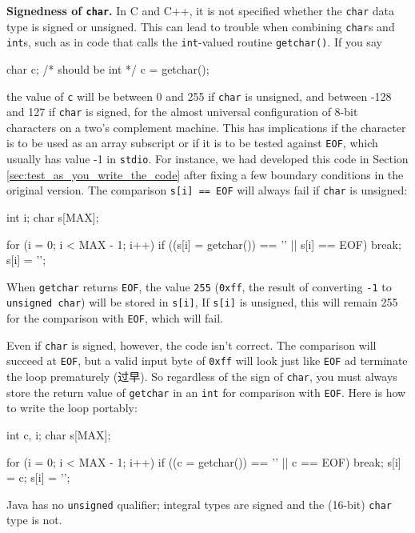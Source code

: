 \textbf{Signedness of \texttt{char}.} In C and C++, it is not specified
whether the \verb'char' data type is signed or unsigned. This can lead to
trouble when combining \verb'char's and \verb'int's, such as in code that
calls the \verb'int'-valued routine \verb'getchar()'. If you say
\begin{wellcode}
    char    c;  /* should be int */
    c = getchar();
\end{wellcode}
the value of \verb'c' will be between 0 and 255 if \verb'char' is unsigned,
and between -128 and 127 if \verb'char' is signed, for the almost universal
configuration of 8-bit characters on a two's complement machine. This has
implications if the character is to be used as an array subscript or if it
is to be tested against \verb'EOF', which usually has value -1 in
\verb'stdio'.  For instance, we had developed this code in Section
\ref{sec:test_as_you_write_the_code} after fixing a few boundary conditions
in the original version. The comparison \verb's[i] == EOF' will always fail
if \verb'char' is unsigned:
\begin{badcode}
    int i;
    char s[MAX];

    for (i = 0; i < MAX - 1; i++)
        if ((s[i] = getchar()) == '\n' || s[i] == EOF)
            break;
    s[i] = '\0';
\end{badcode}
When \verb'getchar' returns \verb'EOF', the value \verb'255' (\verb'0xff',
the result of converting \verb'-1' to \verb'unsigned char') will be stored
in \verb's[i]', If \verb's[i]' is unsigned, this will remain 255 for the
comparison with \verb'EOF', which will fail.

Even if \verb'char' is signed, however, the code isn't correct. The
comparison will succeed at \verb'EOF', but a valid input byte of
\verb'0xff' will look just like \verb'EOF' ad terminate the loop
prematurely (过早). So regardless of the sign of \verb'char', you must
always store the return value of \verb'getchar' in an \verb'int' for
comparison with \verb'EOF'. Here is how to write the loop portably:
\begin{wellcode}
    int c, i;
    char s[MAX];

    for (i = 0; i < MAX - 1; i++) {
        if ((c = getchar()) == '\n' || c == EOF)
            break;
        s[i] = c;
    }
    s[i] = '\0';
\end{wellcode}

Java has no \verb'unsigned' qualifier; integral types are signed and the
(16-bit) \verb'char' type is not.

